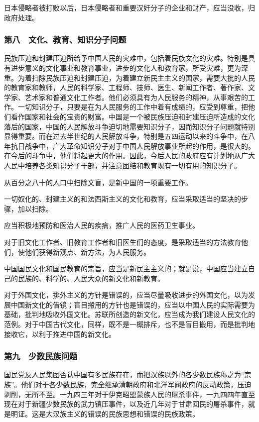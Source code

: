 日本侵略者被打败以后，日本侵略者和重要汉奸分子的企业和财产，应当没收，归政府处理。

\subsubsection{第八　文化、教育、知识分子问题}

民族压迫和封建压迫所给予中国人民的灾难中，包括着民族文化的灾难。特别是具有进步意义的文化事业和教育事业，进步的文化人和教育家，所受灾难，更为深重。为着扫除民族压迫和封建压迫，为着建立新民主主义的国家，需要大批的人民的教育家和教师，人民的科学家、工程师、技师、医生、新闻工作者、著作家、文学家、艺术家和普通文化工作者。他们必须具有为人民服务的精神，从事艰苦的工作。一切知识分子，只要是在为人民服务的工作中着有成绩的，应受到尊重，把他们看作国家和社会的宝贵的财富。中国是一个被民族压迫和封建压迫所造成的文化落后的国家，中国的人民解放斗争迫切地需要知识分子，因而知识分子问题就特别显得重要。而在过去半世纪的人民解放斗争，特别是五四运动以来的斗争中，在八年抗日战争中，广大革命知识分子对于中国人民解放事业所起的作用，是很大的。在今后的斗争中，他们将起更大的作用。因此，今后人民的政府应有计划地从广大人民中培养各类知识分子干部，并注意团结和教育现有一切有用的知识分子。

从百分之八十的人口中扫除文盲，是新中国的一项重要工作。

一切奴化的、封建主义的和法西斯主义的文化和教育，应当采取适当的坚决的步骤，加以扫除。

应当积极地预防和医治人民的疾病，推广人民的医药卫生事业。

对于旧文化工作者、旧教育工作者和旧医生们的态度，是采取适当的方法教育他们，使他们获得新观点、新方法，为人民服务。

中国国民文化和国民教育的宗旨，应当是新民主主义的；就是说，中国应当建立自己的民族的、科学的、人民大众的新文化和新教育。

对于外国文化，排外主义的方针是错误的，应当尽量吸收进步的外国文化，以为发展中国新文化的借镜；盲目搬用的方针也是错误的，应当以中国人民的实际需要为基础，批判地吸收外国文化。苏联所创造的新文化，应当成为我们建设人民文化的范例。对于中国古代文化，同样，既不是一概排斥，也不是盲目搬用，而是批判地接收它，以利于推进中国的新文化。

\subsubsection{第九　少数民族问题}

国民党反人民集团否认中国有多民族存在，而把汉族以外的各少数民族称之为“宗族”。他们对于各少数民族，完全继承清朝政府和北洋军阀政府的反动政策，压迫剥削，无所不至。一九四三年对于伊克昭盟蒙族人民的屠杀事件，一九四四年直至现在对于新疆少数民族的武力镇压事件，以及近几年对于甘肃回民的屠杀事件，就是明证。这是大汉族主义的错误的民族思想和错误的民族政策。

